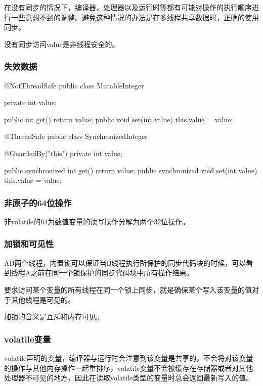 在没有同步的情况下，编译器，处理器以及运行时等都有可能对操作的执行顺序进行一些意想不到的调整。避免这种情况的办法是在多线程共享数据时，正确的使用同步。


没有同步访问value是非线程安全的。


\subsubsection{失效数据}

\begin{Java}
@NotThreadSafe
public class MutableInteger {
	private int value;
	
	public int get() {return value;}
	public void set(int value) { this.value = value;}
} 
\end{Java}


\begin{Java}[get和set必须同时设定为同步才能保证可见性]
@ThreadSafe
public class SynchronizedInteger {
	@GuardedBy("this") private int value;
	
	public synchronized int get() {return value;}
	public synchronized void set(int value) { this.value = value;}
}
\end{Java}


\subsubsection{非原子的64位操作}

非volatile的64为数值变量的读写操作分解为两个32位操作。

\subsubsection{加锁和可见性}

AB两个线程，内置锁可以保证当B线程执行所保护的同步代码块的时候，可以看到线程A之前在同一个锁保护的同步代码块中所有操作结果。

要求访问某个变量的所有线程在同一个锁上同步，就是确保某个写入该变量的值对于其他线程是可见的。

加锁的含义是互斥和内存可见。

\subsubsection{volatile变量}

volatile声明的变量，编译器与运行时会注意到该变量是共享的，不会将对该变量的操作与其他内存操作一起重排序，volatile变量不会被缓存在存储器或者对其他处理器不可见的地方，因此在读取volatile类型的变量时总会返回最新写入的值。


